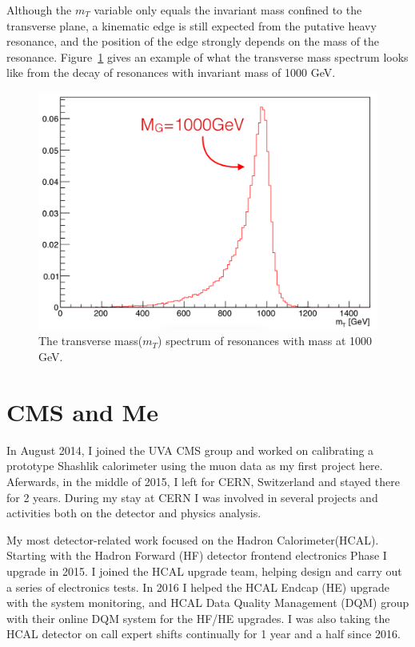 \vspace{0.3cm}
Although the $m_{T}$ variable only equals the invariant mass confined to the transverse plane, a kinematic edge is still expected from the putative heavy resonance, and the position of the edge strongly depends on the mass of the resonance. Figure~\ref{fig:intro_mt} gives an example of what the transverse mass spectrum looks like from the decay of resonances with invariant mass of 1000 GeV.

\begin{figure}[htbp]
\begin{center}
\includegraphics[width=0.72\linewidth]{figures/intro_example_mt.png}
\caption{The transverse mass($m_{T}$) spectrum of resonances with mass at 1000 GeV.}
\label{fig:intro_mt}
\end{center}
\end{figure}


\section{CMS and Me} %
In August 2014, I joined the UVA CMS group and worked on calibrating a prototype Shashlik calorimeter using the muon data as my first project here. Aferwards, in the middle of 2015, I left for CERN, Switzerland and stayed there for 2 years. During my stay at CERN I was involved in several projects and activities both on the detector and physics analysis. 

\vspace{0.3cm}
My most detector-related work focused on the Hadron Calorimeter(HCAL). Starting with the Hadron Forward (HF) detector frontend electronics Phase I upgrade in 2015. I joined the HCAL upgrade team, helping design and carry out a series of electronics tests. In 2016 I helped the HCAL Endcap (HE) upgrade with the system monitoring, and HCAL Data Quality Management (DQM) group with their online DQM system for the HF/HE upgrades. I was also taking the HCAL detector on call expert shifts continually for 1 year and a half since 2016.

